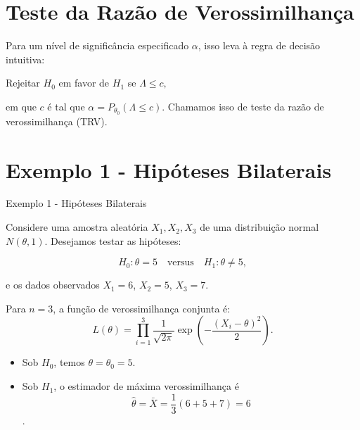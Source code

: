 \documentclass[12pt]{beamer}
\begin{document}
\section{Teste da Razão de Verossimilhança}
\begin{frame}{}
\begin{block}{}
\justifying
Para um nível de significância especificado $\alpha$, isso leva à regra de decisão intuitiva:

\begin{center}
Rejeitar $H_0$ em favor de $H_1$ se $\Lambda \leq c,$
\end{center}

em que $c$ é tal que $\alpha = P_{\theta_0}(\Lambda \leq c)$. Chamamos isso de teste da razão de verossimilhança (TRV).
\end{block}
\end{frame}

\section{Exemplo 1 - Hipóteses Bilaterais}
\begin{frame}{Exemplo 1 - Hipóteses Bilaterais}
	\begin{block}{}
			\justifying
		Considere uma amostra aleatória \(X_1, X_2, X_3\) de uma distribuição normal \(N(\theta, 1)\). Desejamos testar as hipóteses:
		
		\[
		H_0: \theta = 5 \quad \text{versus} \quad H_1: \theta \neq 5,
		\]
		
		e os dados observados \(X_1 = 6\), \(X_2 = 5\), \(X_3 = 7\).		
	\end{block}
\end{frame}

\begin{frame}
	\begin{block}{}

			Para \(n = 3\), a função de verossimilhança conjunta é:
			\[
			L(\theta) = \prod_{i=1}^3 \frac{1}{\sqrt{2\pi}} \exp\left(-\frac{(X_i - \theta)^2}{2}\right).
			\]
			
			\begin{itemize}
				\item Sob \(H_0\), temos \(\theta = \theta_0 = 5\).
				\item Sob \(H_1\), o estimador de máxima verossimilhança é \[\hat{\theta} = \bar{X} = \frac{1}{3}(6 + 5 + 7) = 6\].
			\end{itemize}
			
	\end{block}
\end{frame}
\end{document}
